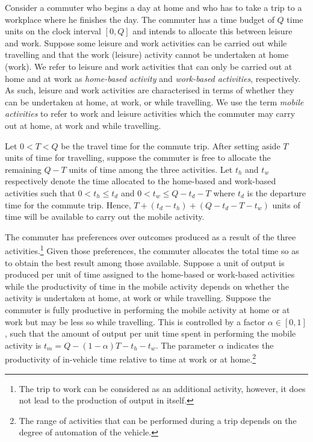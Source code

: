 \documentclass[12pt,a4paper,british]{article}
\begin{document}
Consider a commuter who begins a day at home and who has to take a trip to a workplace where he finishes the day. The commuter has a time budget of $Q$ time units on the clock interval $[0, Q]$ and intends to allocate this between leisure and work. Suppose some leisure and work activities can be carried out while travelling and that the work (leisure) activity cannot be undertaken at home (work). We refer to leisure and work activities that can only be carried out at home and at work as \emph{home-based activity} and \emph{work-based activities}, respectively. As such, leisure and work activities are characterised in terms of whether they can be undertaken at home, at work, or while travelling. We use the term \textit{mobile activities} to refer to work and leisure activities which the commuter may carry out at home, at work and while travelling.

Let $0<T<Q$ be the travel time for the commute trip. After setting aside $T$ units of time for travelling, suppose the commuter is free to allocate the remaining $Q-T$ units of time among the three activities. Let $t_{h}$ and $t_{w}$ respectively denote the time allocated to the home-based and work-based activities such that $0<t_{h}\leq t_{d}$ and $0<t_{w}\leq Q-t_{d}-T$ where $t_d$ is the departure time for the commute trip. Hence,  $T+\left(t_{d}-t_{h}\right)+\left(Q-t_{d}-T-t_{w}\right)$ units of time will be available to carry out the mobile activity. 


The commuter has preferences over outcomes produced as a result of the three activities.\footnote{The trip to work can be considered as an additional activity, however, it does not lead to the production of output in itself.} Given those preferences, the commuter allocates the total time so as to obtain the best result among those available. Suppose a unit of output is produced per unit of time assigned to the home-based or work-based activities while the productivity of time in the mobile activity depends on whether the activity is undertaken at home, at work or while travelling. Suppose the commuter is fully productive in performing the mobile activity at home or at work but may be less so while travelling. This is controlled by a factor $\alpha \in \left[0, 1\right]$, such that the amount of output per unit time spent in performing the mobile activity is $t_{m} = Q - \left( 1 - \alpha \right) T - t_{h}-t_{w}$. The parameter $\alpha$ indicates the productivity of in-vehicle time relative to time at work or at home.\footnote{The range of activities that can be performed during a trip depends on the degree of automation of the vehicle.}
\end{document}
